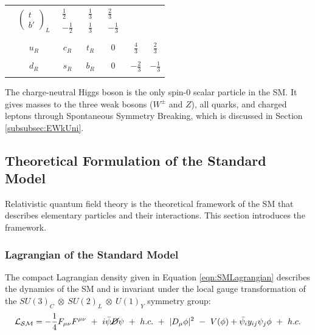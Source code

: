\begin{table}[!htbp]
\begin{center}
\begin{tabular}{| c | c | c | c | c | c | c |}
                     &$\begin{pmatrix}  t \\ b{'} \end{pmatrix}_{L}$  
                    &$\begin{matrix} \frac{1}{2} \\[0.15cm] -\frac{1}{2} \end{matrix}$
                    &$\begin{matrix} \frac{1}{3} \\[0.15cm] \frac{1}{3} \end{matrix}$
                    &$\begin{matrix} \frac{2}{3} \\[0.15cm] -\frac{1}{3} \end{matrix}$\\
                & & & & & & \\
                    & $u_{R}$ & $c_{R}$ &  $t_{R}$ & $0$ & $\frac{4}{3}$  & $\frac{2}{3}$ \\
                    & & & & & & \\
                    & $d_{R}$ & $s_{R}$ &  $b_{R}$ & $0$ & $-\frac{2}{3}$  & $-\frac{1}{3}$ \\
& & & & & & \\
\hline
\end{tabular}
\label{tab:Fermions}
\end{center}
\end{table}

The charge-neutral Higgs boson is the only spin-0 scalar particle in the SM. It gives masses to the three weak bosons ($W^{\pm}$ and $Z$), all quarks, and charged leptons through Spontaneous Symmetry Breaking, which is discussed in Section \ref{subsubsec:EWkUni}.

\subsection{Theoretical Formulation of the Standard Model}
\label{subsec:TheoryFormulation}

Relativistic quantum field theory is the theoretical framework of the SM that describes elementary particles and their interactions. This section introduces the framework. 

\subsubsection{Lagrangian of the Standard Model}
\label{subsubsec:SMLag}
The compact Lagrangian density given in Equation \ref{eqn:SMLagrangian} describes the dynamics of the SM and is invariant under the local gauge transformation of the $SU(3)_{C}~\otimes~SU(2)_{L}~\otimes~U(1)_{Y}$ symmetry group: 
\begin{equation}
\mathcal{L_{SM}} = -\frac{1}{4}F_{\mu\nu}F^{\mu\nu} ~+~ i\bar{\psi} \cancel{D} \psi ~+~ h.c. ~+~ |D_{\mu}\phi|^{2} ~-~V(\phi) + \bar{\psi_{i}}y_{ij}\psi_{j}\phi ~+~ h.c.
\label{eqn:SMLagrangian}
\end{equation}

